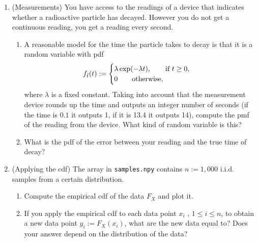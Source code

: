 \documentclass[12pt,twoside]{article}
\begin{document}
\begin{enumerate}
\item (Measurements)  
You have access to the readings of a device that indicates whether a radioactive particle has decayed. However you do not get a continuous reading, you get a reading every second. 
\begin{enumerate}
\item A reasonable model for the time the particle takes to decay is that it is a random variable with pdf
\begin{align}
f_{\tilde{ t }}(t) := \begin{cases}
\lambda \exp(- \lambda t), \qquad \text{if $t\geq 0$},\\
0 \qquad \text{otherwise},
\end{cases}
\end{align}
where $\lambda$ is a fixed constant. Taking into account that the measurement device rounds up the time and outputs an integer number of seconds (if the time is $0.1$ it outputs 1, if it is 13.4 it outputs 14), compute the pmf of the reading from the device. What kind of random variable is this? 
\item What is the pdf of the error between your reading and the true time of decay?
\end{enumerate}

\item (Applying the cdf) The array in \texttt{samples.npy} contains $n := 1,000$ i.i.d. samples from a certain distribution. 
\begin{enumerate}
\item Compute the empirical cdf of the data $F_X$ and plot it. 
\item If you apply the empirical cdf to each data point $x_i$ , $1\leq i \leq n$, to obtain a new data point $y_i := F_X(x_i)$, what are the new data equal to? Does your answer depend on the distribution of the data?
\end{enumerate}
\end{enumerate}
\end{document}
